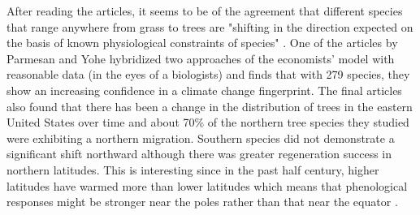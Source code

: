\documentclass[a4paper,10pt]{article}
\begin{document}
After reading the articles, it seems to be of the agreement that different species that range anywhere from grass to trees are "shifting in the direction expected on the basis of known physiological constraints of species" \cite{root2003fingerprints}. One of the articles by Parmesan and Yohe \cite{parmesan2003globally} hybridized two approaches of the economists' model with reasonable data (in the eyes of a biologists) and finds that with 279 species, they show an increasing confidence in a climate change fingerprint. The final articles \cite{woodall2009indicator} also found that there has been a change in the distribution of trees in the eastern United States over time and about 70\% of the northern tree species they studied were exhibiting a northern migration. Southern species did not demonstrate a significant shift northward although there was greater regeneration success in northern latitudes. This is interesting since in the past half century, higher latitudes have warmed more than lower latitudes which means that phenological responses might be stronger near the poles rather than that near the equator \cite{root2003fingerprints}.




\end{document}
